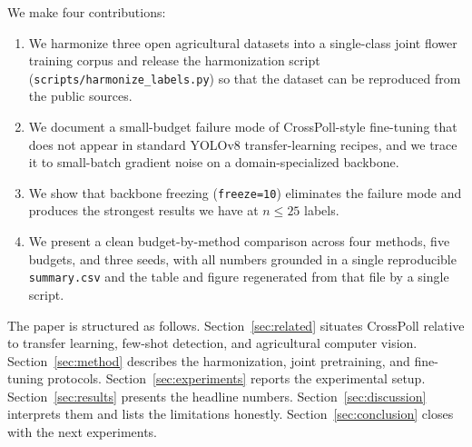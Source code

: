 We make four contributions:

\begin{enumerate}
\item We harmonize three open agricultural datasets into a single-class joint flower training corpus and release the harmonization script (\texttt{scripts/harmonize\_labels.py}) so that the dataset can be reproduced from the public sources.
\item We document a small-budget failure mode of CrossPoll-style fine-tuning that does not appear in standard YOLOv8 transfer-learning recipes, and we trace it to small-batch gradient noise on a domain-specialized backbone.
\item We show that backbone freezing (\texttt{freeze=10}) eliminates the failure mode and produces the strongest results we have at $n \leq 25$ labels.
\item We present a clean budget-by-method comparison across four methods, five budgets, and three seeds, with all numbers grounded in a single reproducible \texttt{summary.csv} and the table and figure regenerated from that file by a single script.
\end{enumerate}

The paper is structured as follows. Section~\ref{sec:related} situates CrossPoll relative to transfer learning, few-shot detection, and agricultural computer vision. Section~\ref{sec:method} describes the harmonization, joint pretraining, and fine-tuning protocols. Section~\ref{sec:experiments} reports the experimental setup. Section~\ref{sec:results} presents the headline numbers. Section~\ref{sec:discussion} interprets them and lists the limitations honestly. Section~\ref{sec:conclusion} closes with the next experiments.
